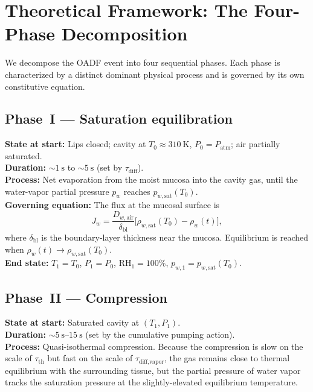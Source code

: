\documentclass[11pt,a4paper]{article}
\newcommand{\pwsat}{p_{w,\text{sat}}}
\theoremstyle{definition}
\theoremstyle{plain}
\begin{document}
\section{Theoretical Framework: The Four-Phase Decomposition}
\label{sec:framework}

We decompose the OADF event into four sequential phases. Each phase is characterized by a distinct dominant physical process and is governed by its own constitutive equation.

\subsection{Phase~I — Saturation equilibration}
\label{sec:phase1}

\textbf{State at start:} Lips closed; cavity at $T_0 \approx \SI{310}{\kelvin}$, $P_0 = P_{\text{atm}}$; air partially saturated.\\
\textbf{Duration:} $\sim\!\SI{1}{\second}$ to $\sim\!\SI{5}{\second}$ (set by $\tau_{\text{diff}}$).\\
\textbf{Process:} Net evaporation from the moist mucosa into the cavity gas, until the water-vapor partial pressure $p_w$ reaches $\pwsat(T_0)$.\\
\textbf{Governing equation:} The flux at the mucosal surface is
\begin{equation}
J_w = \frac{D_{w,\text{air}}}{\delta_{\text{bl}}}\bigl[\rho_{w,\text{sat}}(T_0) - \rho_w(t)\bigr],
\end{equation}
where $\delta_{\text{bl}}$ is the boundary-layer thickness near the mucosa. Equilibrium is reached when $\rho_w(t) \to \rho_{w,\text{sat}}(T_0)$.\\
\textbf{End state:} $T_1 = T_0$, $P_1 = P_0$, $\mathrm{RH}_1 = 100\%$, $p_{w,1} = \pwsat(T_0)$.

\subsection{Phase~II — Compression}
\label{sec:phase2}

\textbf{State at start:} Saturated cavity at $(T_1, P_1)$.\\
\textbf{Duration:} $\sim\!\SIrange{5}{15}{\second}$ (set by the cumulative pumping action).\\
\textbf{Process:} Quasi-isothermal compression. Because the compression is slow on the scale of $\tau_{\text{th}}$ but fast on the scale of $\tau_{\text{diff,vapor}}$, the gas remains close to thermal equilibrium with the surrounding tissue, but the partial pressure of water vapor tracks the saturation pressure at the slightly-elevated equilibrium temperature.\\
\end{document}
